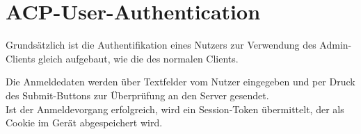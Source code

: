 \section{ACP-User-Authentication}

Grundsätzlich ist die Authentifikation eines Nutzers zur Verwendung des Admin-Clients
gleich aufgebaut, wie die des normalen Clients.

Die Anmeldedaten werden über Textfelder vom Nutzer eingegeben und per Druck des Submit-Buttons
zur Überprüfung an den Server gesendet.\\
Ist der Anmeldevorgang erfolgreich, wird ein Session-Token übermittelt, der als Cookie
im Gerät abgespeichert wird.